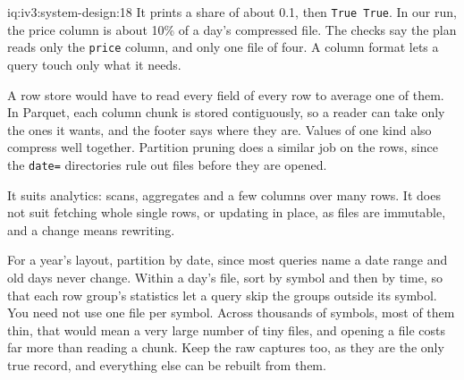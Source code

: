\begin{solution}{iq:iv3:system-design:18}
It prints a share of about 0.1, then \texttt{True True}. In our run, the price column is about 10\% of a day's compressed file. The checks say the plan reads only the \texttt{price} column, and only one file of four. A column format lets a query touch only what it needs.

A row store would have to read every field of every row to average one of them. In Parquet, each column chunk is stored contiguously, so a reader can take only the ones it wants, and the footer says where they are. Values of one kind also compress well together. Partition pruning does a similar job on the rows, since the \texttt{date=} directories rule out files before they are opened.

It suits analytics: scans, aggregates and a few columns over many rows. It does not suit fetching whole single rows, or updating in place, as files are immutable, and a change means rewriting.

For a year's layout, partition by date, since most queries name a date range and old days never change. Within a day's file, sort by symbol and then by time, so that each row group's statistics let a query skip the groups outside its symbol. You need not use one file per symbol. Across thousands of symbols, most of them thin, that would mean a very large number of tiny files, and opening a file costs far more than reading a chunk. Keep the raw captures too, as they are the only true record, and everything else can be rebuilt from them.

\end{solution}

